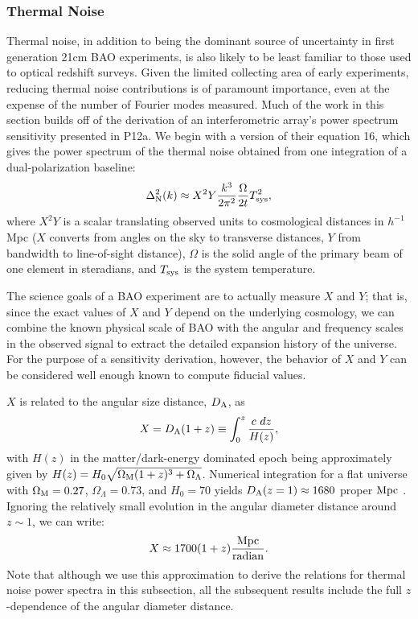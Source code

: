 \documentclass[10pt,iop]{emulateapj}
\begin{document}
\subsubsection{Thermal Noise}
\label{sec:thermal_noise}
Thermal noise, in addition to being the dominant source of uncertainty in first generation
21cm BAO experiments, is also likely to be
least familiar to those used to optical redshift surveys.
Given the limited collecting area of early experiments, reducing thermal noise
contributions is of paramount importance, even at the expense of the number of
Fourier modes measured.
Much of the work in this section builds off of the derivation of an interferometric array's
power spectrum sensitivity presented in P12a.  We begin with a version of their 
equation 16, which gives
the power spectrum of the thermal noise obtained from one integration of a
dual-polarization baseline:
\begin{equation}
\label{eq:single_baseline_sensitivity}
\Delta^2_{\rm N}(k) \approx X^2Y\frac{k^3}{2\pi^2}\frac{\Omega}{2t}T_{\rm sys}^2,
\end{equation}
where $X^2Y$ is a scalar translating observed units to cosmological distances in $h^{-1}$Mpc
($X$ converts from angles on the sky to transverse distances, $Y$ from bandwidth to
line-of-sight distance), $\Omega$ is the solid angle of the primary beam of one element
in steradians, and $T_{\rm sys}$ is the system temperature.

The science goals of a BAO experiment are to actually measure $X$ and $Y$; that is, since
the exact values of $X$ and $Y$ depend on the underlying cosmology, we can combine the
known physical scale of BAO with the angular and frequency scales in the observed signal to extract
the detailed expansion history of the universe.  For the purpose of a sensitivity derivation,
however, the behavior of $X$ and $Y$ can be considered well enough known to compute fiducial
values.

$X$ is related to the angular size distance, $D_{\rm A}$, as
\begin{equation}
\label{eq:X}
    X=D_{\rm A}(1+z)\equiv\int_0^z{\frac{c\ dz}{H(z)}},
\end{equation}
with $H(z)$ in the matter/dark-energy dominated epoch being approximately given by 
$H(z)=H_0\sqrt{\Omega_{\rm M}(1+z)^3+\Omega_\Lambda}$.  Numerical integration for a flat universe
with $\Omega_{\rm M}=0.27$, $\Omega_\Lambda=0.73$, and $H_0=70$ yields $D_{\rm A}(z=1)\approx1680$ 
proper $\rm{Mpc}$ \citep{wright2006}.  Ignoring the relatively small evolution in the 
angular diameter distance around $z\sim1$, we can write:
\begin{equation}
\label{eq:X_approx}
    X\approx 1700 (1+z) \frac{\rm Mpc}{\rm radian}.
\end{equation}
Note that although we use this approximation to derive the relations for thermal noise
power spectra in this subsection, all the subsequent results include the full $z$-dependence of the
angular diameter distance.
\end{document}
